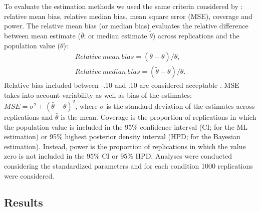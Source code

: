 \documentclass[graybox]{svmult}
\begin{document}
To evaluate the estimation methods we used the same criteria considered by \cite{smidSemSmallSamples2020}: relative mean bias, relative median bias, mean square error (MSE), coverage and power. The relative mean bias (or median bias) evaluates the relative difference between mean estimate ($\bar{\theta}$; or median estimate $\widetilde{\theta}$) across replications and the population value ($\theta$):
\begin{eqnarray}
Relative\ mean\ bias = (\bar{\theta}-\theta)/\theta,\\
Relative\ median\ bias = (\widetilde{\theta}-\theta)/\theta.
\end{eqnarray}
Relative bias included between -.10 and .10 are considered acceptable \cite{smidSemSmallSamples2020}. MSE takes into account variability as well as bias of the estimates: $MSE = \sigma^2 + (\bar{\theta}- \theta)^2$, where $\sigma$ is the standard deviation of the estimates across replications and $\bar{\theta}$ is the mean. Coverage is the proportion of replications in which the population value is included in the 95\% confidence interval (CI; for the ML estimation) or 95\% highest posterior density interval (HPD; for the Bayesian estimation). Instead, power is the proportion of replications in which the value zero is not included in the 95\% CI or 95\% HPD. Analyses were conducted considering the standardized parameters and for each condition 1000 replications were considered.

\subsection{Results}
\end{document}
